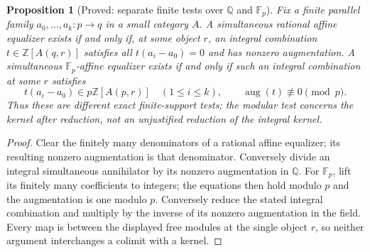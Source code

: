 \documentclass[11pt,a4paper]{article}
\newtheorem{proposition}[theorem]{Proposition}
\theoremstyle{definition}
\begin{document}
\begin{proposition}[Proved: separate finite tests over $\mathbb Q$ and $\mathbb F_p$]\label{main:field-tests}
Fix a finite parallel family $a_0,\ldots,a_k:p\to q$ in a small category $A$. A simultaneous rational affine equalizer exists if and only if, at some object $r$, an integral combination $t\in\mathbb Z[A(q,r)]$ satisfies all $t(a_i-a_0)=0$ and has nonzero augmentation. A simultaneous $\mathbb F_p$-affine equalizer exists if and only if such an integral combination at some $r$ satisfies
\[
 t(a_i-a_0)\in p\mathbb Z[A(p,r)]\quad(1\leq i\leq k),
 \qquad \operatorname{aug}(t)\not\equiv0\pmod p.
\]
Thus these are different exact finite-support tests; the modular test concerns the kernel after reduction, not an unjustified reduction of the integral kernel.
\end{proposition}
\begin{proof}
Clear the finitely many denominators of a rational affine equalizer; its resulting nonzero augmentation is that denominator. Conversely divide an integral simultaneous annihilator by its nonzero augmentation in $\mathbb Q$. For $\mathbb F_p$, lift its finitely many coefficients to integers; the equations then hold modulo $p$ and the augmentation is one modulo $p$. Conversely reduce the stated integral combination and multiply by the inverse of its nonzero augmentation in the field. Every map is between the displayed free modules at the single object $r$, so neither argument interchanges a colimit with a kernel.
\end{proof}
\end{document}
